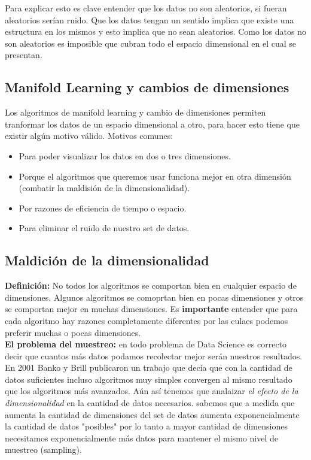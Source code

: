 \documentclass[titlepage,a4paper]{article}
\begin{document}
Para explicar esto es clave entender que los datos no son aleatorios, si fueran aleatorios serían ruido. Que los datos tengan un sentido implica que existe una estructura en los mismos y esto implica que no sean aleatorios. Como los datos no son aleatorios es imposible que cubran todo el espacio dimensional en el cual se presentan. \\

\subsection*{Manifold Learning y cambios de dimensiones}
Los algoritmos de manifold learning y cambio de dimensiones permiten tranformar los datos de un espacio dimensional a otro, para hacer esto tiene que existir algún motivo válido. Motivos comunes: 
\begin{itemize}
\item Para poder visualizar los datos en dos o tres dimensiones. 
\item Porque el algoritmos que queremos usar funciona mejor en otra dimensión (combatir la maldisión de la dimensionalidad). 
\item Por razones de eficiencia de tiempo o espacio. 
\item Para eliminar el ruido de nuestro set de datos. 
\end{itemize} 

\subsection*{Maldición de la dimensionalidad}
\textbf{Definición:} No todos los algoritmos se comportan bien en cualquier espacio de dimensiones. Algunos algoritmos se comoprtan bien en pocas dimensiones y otros se comportan mejor en muchas dimensiones. Es \textbf{importante} entender que para cada algoritmo hay razones completamente diferentes por las culaes podemos preferir muchas o pocas dimensiones. \\

\textbf{El problema del muestreo:} en todo problema de Data Science es correcto decir que cuantos más datos podamos recolectar mejor serán nuestros resultados. En 2001 Banko y Brill publicaron un trabajo que decía que con la cantidad de datos suficientes incluso algoritmos muy simples convergen al mismo resultado que los algoritmos más avanzados. Aún así tenemos que analaizar \textit{el efecto de la dimensionalidad} en la cantidad de datos necesarios. sabemos que a medida que aumenta la cantidad de dimensiones del set de datos aumenta exponencialmente la cantidad de datos "posibles" por lo tanto a mayor cantidad de dimensiones necesitamos exponencialmente más datos para mantener el mismo nivel de muestreo (sampling). \\
\end{document}
